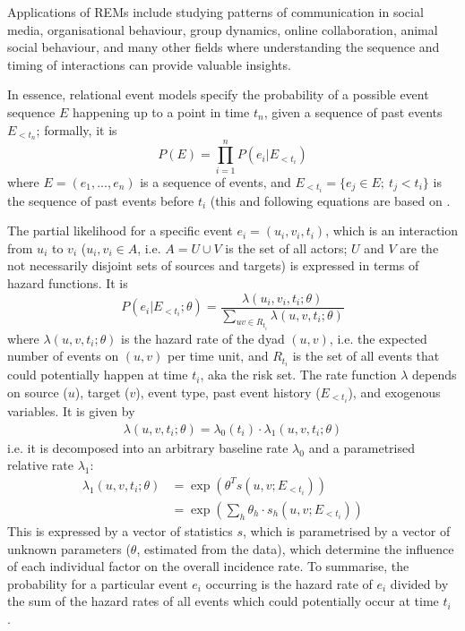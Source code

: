 Applications of REMs include studying patterns of communication in social media, organisational behaviour, group dynamics, online collaboration, animal social behaviour, and many other fields where understanding the sequence and timing of interactions can provide valuable insights.

In essence, relational event models specify the probability of a possible event sequence $E$ happening up to a point in time $t_n$, given a sequence of past events $E_{<t_n}$; formally, it is
\begin{equation*}
	P(E) = \prod_{i=1}^{n}P(e_i|E_{<t_i})
\end{equation*}
where $E = (e_1,...,e_n)$ is a sequence of events, and $E_{<t_i} = \{e_j \in E;\: t_j < t_i\}$ is the sequence of past events before $t_i$ (this and following equations are based on \cite{butts20084,pilny_rem,stadtfeld2017interactions}.

The partial likelihood for a specific event $e_i = (u_i,v_i,t_i)$, which is an interaction from $u_i$ to $v_i$ ($u_i,v_i \in A$, i.e. $A = U \cup V$ is the set of all actors; $U$ and $V$ are the not necessarily disjoint sets of sources and targets) is expressed in terms of hazard functions. It is
\begin{equation*}
	P(e_i|E_{<t_i};\theta) = \frac{\lambda(u_i,v_i,t_i;\theta)}{\sum_{uv\in R_{t_i}}\lambda(u,v,t_i;\theta)}
\end{equation*}
where $\lambda(u,v,t_i;\theta)$ is the hazard rate of the dyad $(u,v)$, i.e. the expected number of events on $(u,v)$ per time unit, and $R_{t_i}$ is the set of all events that could potentially happen at time $t_i$, aka the risk set. The rate function $\lambda$ depends on source ($u$), target ($v$), event type, past event history ($E_{<t_i}$), and exogenous variables. It is given by
\begin{align*}
	\lambda(u,v,t_i;\theta) = \lambda_0(t_i) \cdot \lambda_1(u,v,t_i;\theta)
\end{align*}
i.e. it is decomposed into an arbitrary baseline rate $\lambda_0$ and a parametrised relative rate $\lambda_1$:
\begin{align*}
	\lambda_1(u,v,t_i;\theta) &= \exp(\theta^T s(u,v;E_{<t_i}))\\
	&= \exp(\sum_h \theta_h \cdot s_h(u,v;E_{<t_i}))&&
\end{align*}
This is expressed by a vector of statistics $s$, which is parametrised by a vector of unknown parameters ($\theta$, estimated from the data), which determine the influence of each individual factor on the overall incidence rate. To summarise, the probability for a particular event $e_i$ occurring is the hazard rate of $e_i$ divided by the sum of the hazard rates of all events which could potentially occur at time $t_i$ \cite{butts20084}.

